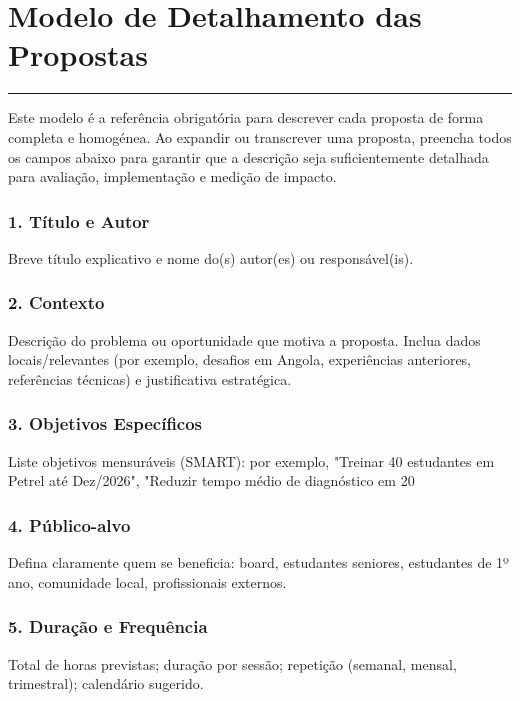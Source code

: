 \documentclass[12pt,a4paper]{article}
\begin{document}

\clearpage
\section*{Modelo de Detalhamento das Propostas}
\textcolor{spe-secondary}{\rule{\linewidth}{0.5pt}}

Este modelo é a referência obrigatória para descrever cada proposta de forma completa e homogénea. Ao expandir ou transcrever uma proposta, preencha todos os campos abaixo para garantir que a descrição seja suficientemente detalhada para avaliação, implementação e medição de impacto.

\subsubsection*{1. Título e Autor}
Breve título explicativo e nome do(s) autor(es) ou responsável(is).

\subsubsection*{2. Contexto}
Descrição do problema ou oportunidade que motiva a proposta. Inclua dados locais/relevantes (por exemplo, desafios em Angola, experiências anteriores, referências técnicas) e justificativa estratégica.

\subsubsection*{3. Objetivos Específicos}
Liste objetivos mensuráveis (SMART): por exemplo, "Treinar 40 estudantes em Petrel até Dez/2026", "Reduzir tempo médio de diagnóstico em 20%

\subsubsection*{4. Público-alvo}
Defina claramente quem se beneficia: board, estudantes seniores, estudantes de 1º ano, comunidade local, profissionais externos.

\subsubsection*{5. Duração e Frequência}
Total de horas previstas; duração por sessão; repetição (semanal, mensal, trimestral); calendário sugerido.
\end{document}
